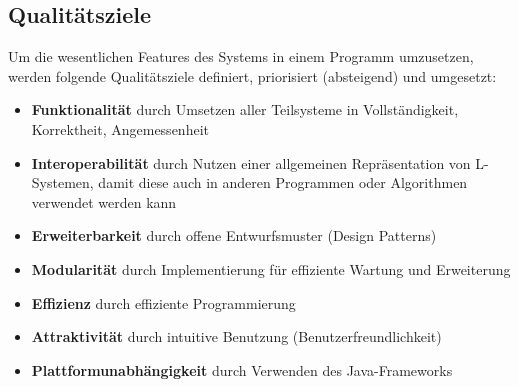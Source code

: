 \subsection*{Qualitätsziele}
Um die wesentlichen Features des Systems in einem Programm umzusetzen, werden folgende Qualitätsziele definiert,
priorisiert (absteigend) und umgesetzt:
\begin{itemize}
    \item \textbf{Funktionalität} durch Umsetzen aller Teilsysteme in Vollständigkeit, Korrektheit, Angemessenheit
    \item \textbf{Interoperabilität} durch Nutzen einer allgemeinen Repräsentation von L-Systemen, damit diese
    auch in anderen Programmen oder Algorithmen verwendet werden kann
    \item \textbf{Erweiterbarkeit} durch offene Entwurfsmuster (Design Patterns)
    \item \textbf{Modularität} durch Implementierung für effiziente Wartung und Erweiterung
    \item \textbf{Effizienz} durch effiziente Programmierung
    \item \textbf{Attraktivität} durch intuitive Benutzung (Benutzerfreundlichkeit)
    \item \textbf{Plattformunabhängigkeit} durch Verwenden des Java-Frameworks
\end{itemize}

